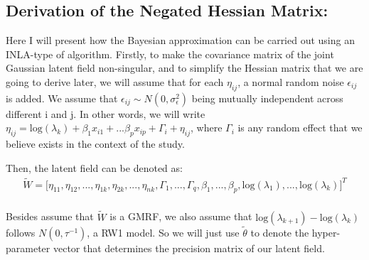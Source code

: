 \documentclass[]{article}
\begin{document}
\hypertarget{derivation-of-the-negated-hessian-matrix}{%
\subsection{Derivation of the Negated Hessian
Matrix:}\label{derivation-of-the-negated-hessian-matrix}}

Here I will present how the Bayesian approximation can be carried out
using an INLA-type of algorithm. Firstly, to make the covariance matrix
of the joint Gaussian latent field non-singular, and to simplify the
Hessian matrix that we are going to derive later, we will assume that
for each \(\eta_{ij}\), a normal random noise \(\epsilon_{ij}\) is
added. We assume that \(\epsilon_{ij} \sim N(0,\sigma^2_{\epsilon})\)
being mutually independent across different i and j. In other words, we
will write
\(\eta_{ij} = \text{log}(\lambda_k)+\beta_1x_{i1}+...\beta_px_{ip} + \Gamma_i+\eta_{ij}\),
where \(\Gamma_i\) is any random effect that we believe exists in the
context of the study.

Then, the latent field can be denoted as:
\begin{equation}\begin{aligned}\label{eqn:field1}
\tilde W = \big[\eta_{11},\eta_{12},...,\eta_{1k},\eta_{2k},...,\eta_{nk},\Gamma_1,...,\Gamma_q,\beta_1,...,\beta_p,\text{log}(\lambda_1),...,\text{log}(\lambda_k)\big]^T\\
\end{aligned}\end{equation}

Besides assume that \(\tilde W\) is a GMRF, we also assume that
\(\text{log}(\lambda_{k+1})-\text{log}(\lambda_k)\) follows
\(N(0,\tau^{-1})\), a RW1 model. So we will just use \(\tilde \theta\)
to denote the hyper-parameter vector that determines the precision
matrix of our latent field.
\end{document}
